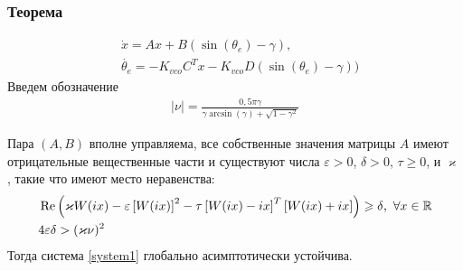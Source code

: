 \documentclass{beamer}
\begin{document}
\begin{frame}
\frametitle{Теорема}
\vspace{-4mm}
 \begin{equation}\label{system1}
 \begin{aligned}
 &\dot{x} = Ax + B(\operatorname{sin}(\theta_e) - \gamma) \text{,}\\
 &\dot{\theta_e} = -K_{vco}C^T x -K_{vco}D(\operatorname{sin}(\theta_e) - \gamma))
 \end{aligned}
\end{equation}
\vspace{-2.5mm}
Введем обозначение
 \begin{equation}
 \begin{aligned}
\mid\nu\mid = \frac{0,5\pi\gamma}{\gamma \operatorname{arcsin} (\gamma) + \sqrt{1-\gamma^2}}
 \end{aligned}
\end{equation}
\vspace{-3mm}
\begin{theorem}
Пара $(A, B)$ вполне управляема, все собственные значения матрицы $A$ имеют отрицательные вещественные части и существуют числа $\varepsilon > 0$, $\delta > 0$, $\tau \geqslant 0$, и $\varkappa$, такие что имеют место неравенства:\vspace{-2.5mm}
 \begin{align*}
&\operatorname{Re}\left( \varkappa W(ix)- \varepsilon\left[W(ix)\right]^2-\tau\left[ W(ix)-ix \right]^T\left[W(ix)+ix \right]\right) \geqslant \delta \text{,}\enskip\forall x \in \mathbb{R}\label{first_th_eq}\\
&4\varepsilon\delta > (\varkappa\nu)^2
\end{align*}
Тогда система \eqref{system1} глобально асимптотически устойчива.
\end{theorem}
\end{frame}

\end{document}
